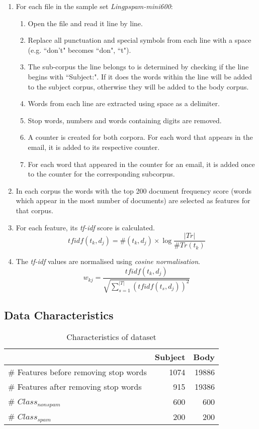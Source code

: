 \documentclass[10pt, a4paper]{article}
\begin{document}
\begin{enumerate}
\item For each file in the sample set \emph{Lingpspam-mini600}:
	\begin{enumerate}[label*=\arabic*.]
	\item Open the file and read it line by line.
	\item Replace all punctuation and special symbols from each line with a space (e.g. ``don't" becomes ``don", ``t").
	\item The sub-corpus the line belongs to is determined by checking if the line begins with ``Subject:". If it does the words within the line will be added to the subject corpus, otherwise they will be added to the body corpus.
	\item Words from each line are extracted using space as a delimiter.
	\item Stop words, numbers and words containing digits are removed.
	\item A counter is created for both corpora. For each word that appears in the email, it is added to its respective counter.
	\item For each word that appeared in the counter for an email, it is added once to the counter for the corresponding subcorpus.
	\end{enumerate}
\item In each corpus the words with the top 200 document frequency score (words which appear in the most number of documents) are selected as features for that corpus.
\item For each feature, its \emph{tf-idf} score is calculated.
$$ tfidf(t_k, d_j) = \#(t_k, d_j) \times \log \frac{|Tr|}{\#Tr(t_k)} $$
\item The \emph{tf-idf} values are normalised using \emph{cosine normalisation}.
$$ w_{kj} = \frac{tfidf(t_k, d_j)}{\sqrt{\sum_{s=1}^{|T|} (tfidf(t_s, d_j))^2 }} $$
\end{enumerate}

\subsection{Data Characteristics}

\setlength\extrarowheight{3pt}

\begin{table}[H]
\centering
\caption{Characteristics of dataset}\vspace{1em}
\begin{tabular}{@{}lrr@{}}
\toprule
& \textbf{Subject} & \textbf{Body} \\
\midrule
\# Features before removing stop words & 1074 & 19886 \\
\# Features after removing stop words & 915 & 19386 \\
\# $Class_{nonspam}$ & 600 & 600 \\
\# $Class_{spam}$ & 200 & 200 \\
\bottomrule
\end{tabular}
\label{table:datacharacteristics}
\end{table}
\end{document}
